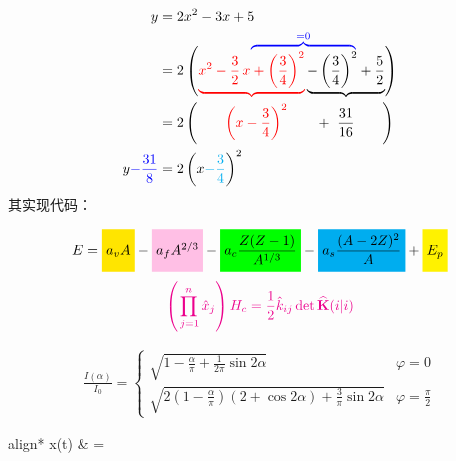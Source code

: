 \begin{align}\label{eq:pqFormel}
y &= 2x^2 -3x +5\\\nonumber
& \hphantom{= \ 2\left(x^2-\frac{3}{2}\,x\right. }%
\textcolor{blue}{%
	\overbrace{\hphantom{+\left(\frac{3}{4}\right)^2- %
			\left(\frac{3}{4}\right)^2}}^{=0}}\\[-11pt]
&= 2\left(\textcolor{red}{%
	\underbrace{%
		x^2-\frac{3}{2}\,x + \left(\frac{3}{4}\right)^2}%
}%
\underbrace{%
	- \left(\frac{3}{4}\right)^2 + \frac{5}{2}}%
\right)\\
&= 2\left(\qquad\textcolor{red}{\left(x-\frac{3}{4}\right)^2}
\qquad + \ \frac{31}{16}\qquad\right)\\
y\textcolor{blue}{-\frac{31}{8}}
&= 2\left(x\textcolor{cyan}{-\frac{3}{4}}\right)^2%
\end{align}
其实现代码：
\begin{latexcode}
\usepackage{amsmath}
\usepackage{empheq}
\usepackage{xcolor}
\usepackage{graphicx}
\def\xstrut{\vphantom{\dfrac{(A)^1}{(B)^1}}}
\begin{equation}\label{eq:6}
 E = %
 \colorbox{darkyellow}{$\xstrut a_vA$} -
 \colorbox{hellmagenta}{$\xstrut a_fA^{2/3}$} -
 \colorbox{green}{$\xstrut a_c\dfrac{Z(Z-1)}{A^{1/3}}$} -
 \colorbox{cyan}{$\xstrut a_s\dfrac{(A-2Z)^2}{A}$} +
 \colorbox{yellow}{$\xstrut E_p$}
\end{equation}
\[
 \color{magenta}
 \left(\prod^n_{\, j=1}\hat{x}_j\right)H_c=%
 \frac{1}{2}\hat{k}_{ij}\det\widehat{\mathbf{K}}(i|i)
\]
\colorbox{hellmagenta}{%
 \parbox{\linewidth-2\fboxsep}{%
  \begin{align}\label{eq:3}
   \frac{I(\alpha )}{I_{0}}=%
   \begin{cases}
    \sqrt{1-\frac{\alpha}{\pi}+\frac{1}{2\pi}\sin 2\alpha}
    & \varphi =0\\[0.4cm]
      \sqrt{2\left(1-\frac{\alpha}{\pi}\right)%
      \left(2+\cos 2\alpha \right)+\frac{3}{\pi}\sin 2\alpha}
    & \varphi =\frac{\pi}{2}
  \end{cases}
 \end{align}%
}}
\begin{empheq}[box=\fcolorbox{blue}{hellcyan}]{align*}
 x(t) & =\\

\end{empheq}
\end{latexcode}
